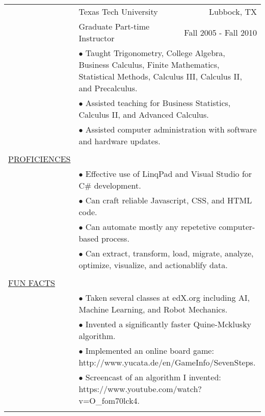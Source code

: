 \documentclass[11pt,oneside,letterpaper,titlepage,fleqn]{article}
\begin{document}
\newpage				
\hspace{-1em}\begin{tabular}[h]{@{}p{3.25cm}@{}lr}
						& Texas Tech University & Lubbock, TX\\
						& Graduate Part-time Instructor	 &  Fall 2005 - Fall 2010\\
           & \multicolumn{2}{p{14cm}}{$\bullet$ Taught Trigonometry, College Algebra, Business Calculus, Finite Mathematics, Statistical
Methods, Calculus III, Calculus II, and Precalculus.}\\
           & \multicolumn{2}{p{14cm}}{$\bullet$ Assisted teaching for Business Statistics, Calculus II, and Advanced Calculus.}\\
           & \multicolumn{2}{p{14cm}}{$\bullet$ Assisted computer administration with software and hardware updates.}\\
\\
\underline{PROFICIENCES}\\    
           & \multicolumn{2}{p{14cm}}{$\bullet$ Effective use of LinqPad and Visual Studio for C\# development.}\\
           & \multicolumn{2}{p{14cm}}{$\bullet$ Can craft reliable Javascript, CSS, and HTML code.}\\           
           & \multicolumn{2}{p{14cm}}{$\bullet$ Can automate mostly any repetetive computer-based process. }\\					
           & \multicolumn{2}{p{14cm}}{$\bullet$ Can extract, transform, load, migrate, analyze, optimize, visualize, and actionablify data.}\\						
\\
\underline{FUN FACTS}\\
           & \multicolumn{2}{p{14cm}}{$\bullet$ Taken several classes at edX.org including AI, Machine Learning, and Robot Mechanics.}\\
           & \multicolumn{2}{p{14cm}}{$\bullet$ Invented a significantly faster Quine-Mcklusky algorithm.}\\ 					
           & \multicolumn{2}{p{14cm}}{$\bullet$ Implemented an online board game: http://www.yucata.de/en/GameInfo/SevenSteps.}\\
           & \multicolumn{2}{p{14cm}}{$\bullet$ Screencast of an algorithm I invented: https://www.youtube.com/watch?v=O\_fom70lck4.}\\			          
\\					  				
\end{tabular}
\end{document}
